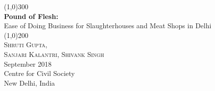 \documentclass[a4paper, 12pt]{article}
\begin{document}
\begin{titlepage}
\begin{center}
\line(1,0){300}\\
[0.25in]
\huge{\bfseries \textcolor{CCSbrown} {Pound of Flesh: }} \\
[0.5cm]
\large {Ease of Doing Business for Slaughterhouses and Meat Shops in Delhi} \\
\line(1,0){200}\\
[1in]
\textsc{\huge Shruti Gupta, \\ Sanjari Kalantri, Shivank Singh} \\
[1.5cm]
{\Large September 2018} \\
[2.0cm]
{\LARGE Centre for Civil Society} \\
[0.1mm]
{\Large New Delhi, India} \\
[2.0cm]
\end{center}
\end{titlepage}
\tableofcontents
\newpage
{}
\end{document}
